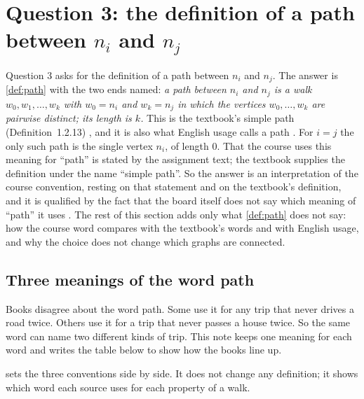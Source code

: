 \section{Question 3: the definition of a path between $n_i$ and $n_j$}\label{sec:path}

Question 3 asks for the definition of a path between $n_i$ and $n_j$.
The answer is \cref{def:path} with the two ends named: \emph{a path between $n_i$ and $n_j$ is a walk $w_0,w_1,\dots,w_k$ with $w_0=n_i$ and $w_k=n_j$ in which the vertices $w_0,\dots,w_k$ are pairwise distinct; its length is $k$.}
This is the textbook's simple path (Definition~1.2.13) \cite[p.~22]{petrosyan2015grafneri}, and it is also what English usage calls a path \cite{grinberg2025graph}.
For $i=j$ the only such path is the single vertex $n_i$, of length $0$.
That the course uses this meaning for ``path'' is stated by the assignment text; the textbook supplies the definition under the name ``simple path''.
So the answer is an interpretation of the course convention, resting on that statement and on the textbook's definition, and it is qualified by the fact that the board itself does not say which meaning of ``path'' it uses \cite{whiteboard1,whiteboard2}.
The rest of this section adds only what \cref{def:path} does not say: how the course word compares with the textbook's words and with English usage, and why the choice does not change which graphs are connected.

\subsection{Three meanings of the word path}\label{sec:conventions}

\plainwords Books disagree about the word path.
Some use it for any trip that never drives a road twice.
Others use it for a trip that never passes a house twice.
So the same word can name two different kinds of trip.
This note keeps one meaning for each word and writes the table below to show how the books line up.

 sets the three conventions side by side.
It does not change any definition; it shows which word each source uses for each property of a walk.

